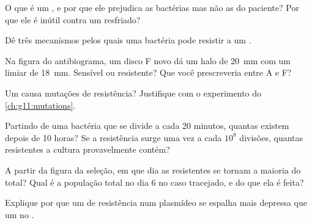 \begin{exercise}[$\star$]\label{exo:g11:antibiotic-resistance:2}
O que é um , e por que ele prejudica as bactérias mas não as
 do paciente? Por que ele é inútil contra um resfriado?
\end{exercise}

\begin{exercise}[$\star$]\label{exo:g11:antibiotic-resistance:3}
Dê três mecanismos pelos quais uma bactéria pode resistir a um .
\end{exercise}

\begin{exercise}[$\star$]\label{exo:g11:antibiotic-resistance:4}
Na figura do antibiograma, um disco F novo dá um halo de \qty{20}{mm}
com um limiar de \qty{18}{mm}. Sensível ou resistente? Que 
você prescreveria entre A e F?
\end{exercise}

\begin{exercise}[$\star$]\label{exo:g11:antibiotic-resistance:5}
Um  causa mutações de resistência? Justifique com o
experimento do \cref{ch:g11:mutations}.
\end{exercise}

\begin{exercise}[$\star\star$]\label{exo:g11:antibiotic-resistance:6}
Partindo de uma bactéria que se divide a cada 20 minutos, quantas
existem depois de 10 horas? Se a resistência surge uma vez a cada
$10^8$ divisões, quantas  resistentes a cultura provavelmente
contém?
\end{exercise}

\begin{exercise}[$\star\star$]\label{exo:g11:antibiotic-resistance:7}
A partir da figura da seleção, em que dia as  resistentes se
tornam a maioria do total? Qual é a população total no dia 6 no caso
tracejado, e do que ela é feita?
\end{exercise}

\begin{exercise}[$\star\star$]\label{exo:g11:antibiotic-resistance:8}
Explique por que um  de resistência num plasmídeo se espalha mais
depressa que um no .
\end{exercise}

